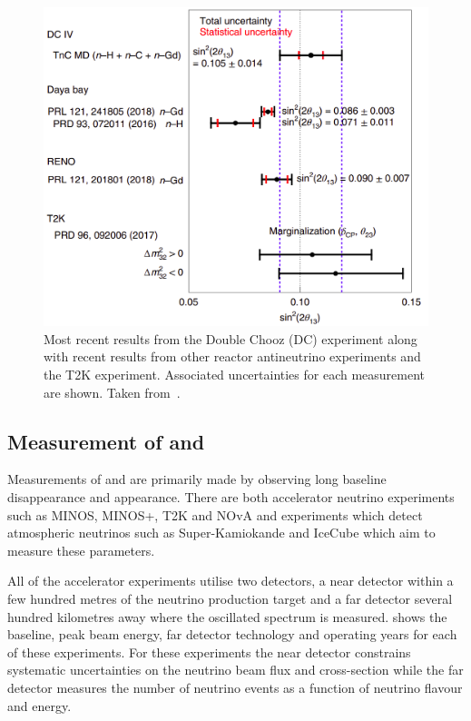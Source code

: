 \begin{figure}[h]
  \centering
  \includegraphics[width=.7\linewidth]{files/figures/theory/theta13Measurements}
  \caption{Most recent results from the Double Chooz (DC) experiment along with recent results from other reactor antineutrino experiments and the T2K experiment. Associated uncertainties for each measurement are shown. Taken from~\cite{dcIV}.}
  \label{fig:theta13Measurements}
\end{figure}

\subsection{Measurement of  and }
\label{sec:theory:currentState:lbl}

Measurements of  and  are primarily made by observing long baseline \numu disappearance and \nue appearance.
There are both accelerator neutrino experiments such as MINOS, MINOS+, T2K and NOvA and experiments which detect atmospheric neutrinos such as Super-Kamiokande and IceCube which aim to measure these parameters.

All of the accelerator experiments utilise two detectors, a near detector within a few hundred metres of the neutrino production target and a far detector several hundred kilometres away where the oscillated spectrum is measured.
 shows the baseline, peak beam energy, far detector technology and operating years for each of these experiments.
For these experiments the near detector constrains systematic uncertainties on the neutrino beam flux and cross-section while the far detector measures the number of neutrino events as a function of neutrino flavour and energy.

